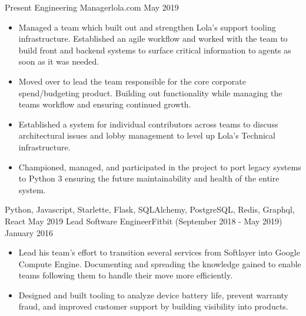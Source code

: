 %
%
%
\begin{experiences}
  \experience
  {Present}  {Engineering Manager}{lola.com}
  {May 2019}   {
                      \begin{itemize}
                        \item Managed a team which built out and strengthen Lola's support tooling infrastructure. Established an agile workflow and worked with the team to build front and backend systems to surface critical information to agents as soon as it was needed.
                        \item Moved over to lead the team responsible for the core corporate spend/budgeting product. Building out functionality while managing the teams workflow and ensuring continued growth.
                        \item Established a system for individual contributors across teams to discuss architectural issues and lobby management to level up Lola's Technical infrastructure. 
                        \item Championed, managed, and participated in the project to port legacy systems to Python 3 ensuring the future maintainability and health of the entire system.
                      \end{itemize}
                  }
                  {Python, Javascript, Starlette, Flask, SQLAlchemy, PostgreSQL, Redis, Graphql, React}
  \emptySeparator
  \experience
  {May 2019}  {Lead Software Engineer}{Fitbit {\footnotesize (September 2018 - May 2019)}}
  {January 2016}   {
                      \begin{itemize}
                        \item Lead his team’s effort to transition several services from Softlayer into Google Compute Engine. Documenting and spreading the knowledge gained to enable teams following them to handle their move more efficiently.
                        \item Designed and built tooling to analyze device battery life, prevent warranty fraud, and improved customer support by building visibility into products.
                      \end{itemize}
}
\end{experiences}
